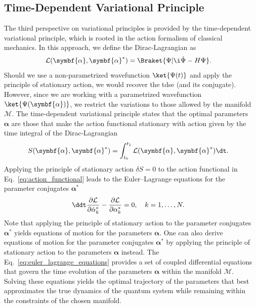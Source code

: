 \subsection{Time-Dependent Variational Principle}\label{sec:time_dependent_variational_principle}
The third perspective on variational principles is provided by the time-dependent variational principle, which is rooted in the action formalism of classical mechanics. In this approach, we define the Dirac-Lagrangian as
\begin{equation}\label{eq:dirac_lagrangian}
\mathcal{L}(\symbf{\alpha},\symbf{\alpha}^\ast)=\Braket{\Psi|\i\dot\Psi-H\Psi}.
\end{equation}
Should we use a non-parametrized wavefunction $\ket{\Psi(t)}$ and apply the principle of stationary action, we would recover the \acrshort{tdse} (and its conjugate). However, since we are working with a parametrized wavefunction $\ket{\Psi(\symbf{\alpha})}$, we restrict the variations to those allowed by the manifold $\mathcal{M}$. The time-dependent variational principle states that the optimal parameters $\symbf{\alpha}$ are those that make the action functional stationary
with action given by the time integral of the Dirac-Lagrangian
\begin{equation}\label{eq:action_functional}
S(\symbf{\alpha},\symbf{\alpha}^\ast)=\int_{t_0}^{t_1}\mathcal{L}(\symbf{\alpha},\symbf{\alpha}^\ast)\dt.
\end{equation}
Applying the principle of stationary action $\delta S=0$ to the action functional in Eq.~\eqref{eq:action_functional} leads to the Euler--Lagrange equations for the parameter conjugates $\symbf{\alpha}^\ast$
\begin{equation}\label{eq:euler_lagrange_equations}
\ddt\frac{\partial\mathcal{L}}{\partial\dot{\alpha}_k^\ast}-\frac{\partial\mathcal{L}}{\partial\alpha_k^\ast}=0,\quad k=1,\ldots,N.
\end{equation}
Note that applying the principle of stationary action to the parameter conjugates $\symbf{\alpha}^\ast$ yields equations of motion for the parameters $\symbf{\alpha}$. One can also derive equations of motion for the parameter conjugates $\symbf{\alpha}^\ast$ by applying the principle of stationary action to the parameters $\symbf{\alpha}$ instead. The Eq.~\eqref{eq:euler_lagrange_equations} provides a set of coupled differential equations that govern the time evolution of the parameters $\symbf{\alpha}$ within the manifold $\mathcal{M}$. Solving these equations yields the optimal trajectory of the parameters that best approximates the true dynamics of the quantum system while remaining within the constraints of the chosen manifold.

